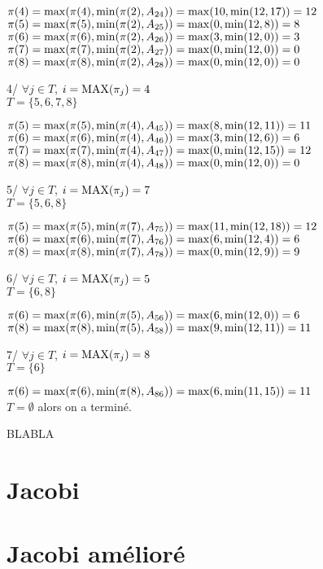 \documentclass{article}
\begin{document}
$\pi(4) = \mmax(\pi(4), \mmin(\pi(2), A_{24})) = \mmax(10, \mmin(12,17)) = 12$\\
$\pi(5) = \mmax(\pi(5), \mmin(\pi(2), A_{25})) = \mmax(0, \mmin(12,8)) = 8$\\
$\pi(6) = \mmax(\pi(6), \mmin(\pi(2), A_{26})) = \mmax(3, \mmin(12,0)) = 3$\\
$\pi(7) = \mmax(\pi(7), \mmin(\pi(2), A_{27})) = \mmax(0, \mmin(12,0)) = 0$\\
$\pi(8) = \mmax(\pi(8), \mmin(\pi(2), A_{28})) = \mmax(0, \mmin(12,0)) = 0$

4/
$\forall j \in T$, $i = \mMAX(\pi_j) = 4$\\
$ T = \{5,6,7,8\}$

$\pi(5) = \mmax(\pi(5), \mmin(\pi(4), A_{45})) = \mmax(8, \mmin(12,11)) = 11$\\
$\pi(6) = \mmax(\pi(6), \mmin(\pi(4), A_{46})) = \mmax(3, \mmin(12,6)) = 6$\\
$\pi(7) = \mmax(\pi(7), \mmin(\pi(4), A_{47})) = \mmax(0, \mmin(12,15)) = 12$\\
$\pi(8) = \mmax(\pi(8), \mmin(\pi(4), A_{48})) = \mmax(0, \mmin(12,0)) = 0$

5/
$\forall j \in T$, $i = \mMAX(\pi_j) = 7$\\
$ T = \{5,6,8\}$

$\pi(5) = \mmax(\pi(5), \mmin(\pi(7), A_{75})) = \mmax(11, \mmin(12,18)) = 12$\\
$\pi(6) = \mmax(\pi(6), \mmin(\pi(7), A_{76})) = \mmax(6, \mmin(12,4)) = 6$\\
$\pi(8) = \mmax(\pi(8), \mmin(\pi(7), A_{78})) = \mmax(0, \mmin(12,9)) = 9$

6/
$\forall j \in T$, $i = \mMAX(\pi_j) = 5$\\
$ T = \{6,8\}$

$\pi(6) = \mmax(\pi(6), \mmin(\pi(5), A_{56})) = \mmax(6, \mmin(12,0)) = 6$\\
$\pi(8) = \mmax(\pi(8), \mmin(\pi(5), A_{58})) = \mmax(9, \mmin(12,11)) = 11$

7/
$\forall j \in T$, $i = \mMAX(\pi_j) = 8$\\
$ T = \{6\}$

$\pi(6) = \mmax(\pi(6), \mmin(\pi(8), A_{86})) = \mmax(6, \mmin(11,15)) = 11$\\

$T = \emptyset$ alors on a terminé.

BLABLA

\section{Jacobi}

\section{Jacobi amélioré}
\end{document}
